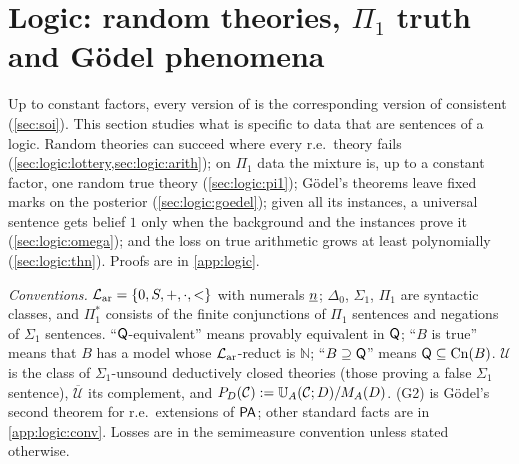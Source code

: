 \section{Logic: random theories, \texorpdfstring{$\Pi_1$}{Pi1} truth and G\"odel phenomena}\label{sec:logic}

Up to constant factors, every version of \SAIabbr is the corresponding version of consistent \SOIabbr (\cref{sec:soi}). This section studies what is specific to data that are sentences of a logic. Random theories can succeed where every r.e.\ theory fails (\cref{sec:logic:lottery,sec:logic:arith}); on $\Pi_1$ data the mixture is, up to a constant factor, one random true theory (\cref{sec:logic:pi1}); Gödel's theorems leave fixed marks on the posterior (\cref{sec:logic:goedel}); given all its instances, a universal sentence gets belief $1$ only when the background and the instances prove it (\cref{sec:logic:omega}); and the loss on true arithmetic grows at least polynomially (\cref{sec:logic:thn}). Proofs are in \cref{app:logic}.

\emph{Conventions.} $\mathcal{L}_{\mathrm{ar}}=\{0,S,+,\cdot,<\}$ with numerals $\underline{n}$; $\Delta_0$, $\Sigma_1$, $\Pi_1$ are syntactic classes, and $\Pi_1^*$ consists of the finite conjunctions of $\Pi_1$ sentences and negations of $\Sigma_1$ sentences. ``$\mathsf{Q}$-equivalent'' means provably equivalent in $\mathsf{Q}$; ``$B$ is true'' means that $B$ has a model whose $\mathcal{L}_{\mathrm{ar}}$-reduct is $\mathbb N$; ``$B\supseteq\mathsf{Q}$'' means $\mathsf{Q}\subseteq\mathrm{Cn}(B)$. $\mathcal U$ is the class of $\Sigma_1$-unsound deductively closed theories (those proving a false $\Sigma_1$ sentence), $\overline{\mathcal U}$ its complement, and $P_D(\mathcal C):=\mathbb{U}_{A}(\mathcal C;D)/M_{A}(D)$. (G2) is Gödel's second theorem for r.e.\ extensions of $\mathsf{PA}$; other standard facts are in \cref{app:logic:conv}. Losses are in the semimeasure convention unless stated otherwise.

